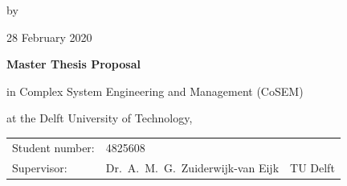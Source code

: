 \begin{titlepage}

\begin{center}


\vspace*{2\bigskipamount}

{\makeatletter
\titlestyle\color{tudelft-cyan}\Huge\@title
\makeatother}

{\makeatletter
\ifx\@subtitle\undefined\else
    \bigskip
    \titlefont\titleshape\LARGE\@subtitle
\fi
\makeatother}

\bigskip
\bigskip

by

\bigskip
\bigskip

{\makeatletter
\titlefont\Large\bfseries\@author
\makeatother}

\vfill

28 February 2020

\bigskip
\bigskip

{\bfseries Master Thesis Proposal}

in Complex System Engineering and Management (CoSEM)

\bigskip
\bigskip

at the Delft University of Technology,


\vfill

\begin{tabular}{lll}
    Student number: & 4825608 \\
    Supervisor: 
        & Dr.\ A.\ M.\ G.\ Zuiderwijk-van Eijk & TU Delft \\
    

\end{tabular}
\end{center}
\end{titlepage}

